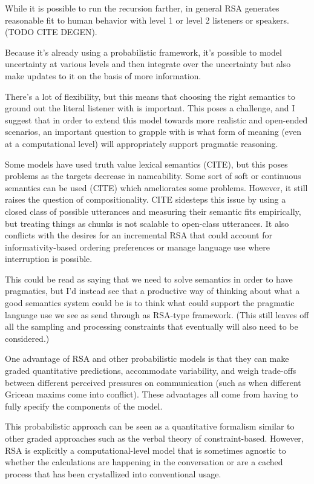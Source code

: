 \documentclass[]{article}
\begin{document}
While it is possible to run the recursion farther, in general RSA generates reasonable fit to human behavior with level 1 or level 2 listeners or speakers. (TODO CITE DEGEN). 

Because it's already using a probabilistic framework, it's possible to model uncertainty at various levels and then integrate over the uncertainty but also make updates to it on the basis of more information. 

There's a lot of flexibility, but this means that choosing the right semantics to ground out the literal listener with is important. This poses a challenge, and I suggest that in order to extend this model towards more realistic and open-ended scenarios, an important question to grapple with is what form of meaning (even at a computational level) will appropriately support pragmatic reasoning. 

Some models have used truth value lexical semantics (CITE), but this poses problems as the targets decrease in nameability. Some sort of soft or continuous semantics can be used (CITE) which ameliorates some problems. However, it still raises the question of compositionality. CITE sidesteps this issue by using a closed class of possible utterances and measuring their semantic fits empirically, but treating things as chunks is not scalable to open-class utterances. It also conflicts with the desires for an incremental RSA that could account for informativity-based ordering preferences or manage language use where interruption is possible. 

This could be read as saying that we need to solve semantics in order to have pragmatics, but I'd instead see that a productive way of thinking about what a good semantics system could be is to think what could support the pragmatic language use we see as send through as RSA-type framework. (This still leaves off all the sampling and processing constraints that eventually will also need to be considered.) 

One advantage of RSA and other probabilistic models is that they can make graded quantitative predictions, accommodate variability, and weigh trade-offs between different perceived pressures on communication (such as when different Gricean maxims come into conflict). These advantages all come from having to fully specify the components of the model. 

This probabilistic approach can be seen as a quantitative formalism similar to other graded approaches such as the verbal theory of constraint-based. However, RSA is explicitly a computational-level model that is sometimes agnostic to whether the calculations are happening in the conversation or are a cached process that has been crystallized into conventional usage. 
\end{document}
